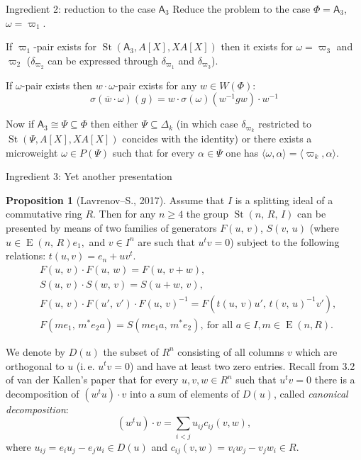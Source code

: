 \documentclass{beamer} %
\DeclareMathOperator{\E}{E}
\DeclareMathOperator{\St}{St}
\newcommand{\rA}{\mathsf{A}}
\theoremstyle{definition}
\newtheorem*{prop}{Proposition}
\begin{document}
\begin{frame}{Ingredient 2: reduction to the case $\rA_3$}
Reduce the problem to the case $\Phi = \rA_3$, $\omega = \varpi_1$.

\pause If $\varpi_1$-pair exists for $\St(\rA_3, A[X], XA[X])$ then it exists for $\omega = \varpi_3$ and $\varpi_2$ ($\delta_{\varpi_2}$ can be expressed through $\delta_{\varpi_1}$ and $\delta_{\varpi_3}$).

\pause If $\omega$-pair exists then $w \cdot \omega$-pair exists for any $w \in W(\Phi)$:
\[ \sigma(\overline{w} \cdot \omega)(g) = w \cdot \sigma(\omega)(w^{-1} g w) \cdot w^{-1} \]

\pause Now if $\rA_3 \cong \Psi \subseteq \Phi$ then either $\Psi \subseteq \Delta_k$ (in which case $\delta_{\varpi_k}$ restricted to $\St(\Psi, A[X], XA[X])$ concides with the identity) or there exists a microweight $\omega \in P(\Psi)$ such that for every $\alpha \in \Psi$ one has $\langle \omega, \alpha \rangle = \langle \varpi_k, \alpha \rangle$.
\end{frame}

\begin{frame}{Ingredient 3: Yet another presentation}
\begin{prop}[Lavrenov--S., 2017]
\label{prop:rel-presentation}
Assume that $I$ is a splitting ideal of a commutative ring $R$.
Then for any $n\geq 4$ the group $\St(n,\,R,\,I)$ can be presented by means of two families of generators $F(u,\,v)$, $S(v,\,u)$
(where $u\in \E(n,\,R)e_1,$ and $v\in I^n$ are such that $u^{t}v=0$) subject to the following relations: $t(u, v) = e_n + u v^t$.
\begin{align*}
&F(u,\,v)\cdot F(u,\,w)=F(u,\,v+w), \\
&S(u,\,v)\cdot S(w,\,v)=S(u+w,\,v), \\
&F(u,\,v)\cdot F(u',\,v') \cdot F(u,\,v)^{-1}=F(t(u,\,v)u',\,t(v,\,u)^{-1} v'), \\
&F(me_1,\,m^{*}e_{2}a)=S(me_{1}a,\,m^{*}e_{2}),\ \text{for all $a\in I$,}\, m \in \E(n, R).
\end{align*}
\end{prop}
\end{frame}

\begin{frame}
We denote by $D(u)$ the subset of $R^n$ consisting of all columns $v$ which are orthogonal to $u$
(i.\,e. $u^{t} v = 0$) and have at least two zero entries.
\pause Recall from 3.2 of van der Kallen's paper that for every $u, v, w \in R^n$ such that $u^t v = 0$ there is a decomposition of $(w^t u) \cdot v$ into a sum of elements of $D(u)$, called \textit{canonical decomposition}:
\pause \begin{equation}
\label{eq:canonical} (w^tu) \cdot v=\sum_{i<j}u_{ij} c_{ij}(v, w),
\end{equation}
where $u_{ij} =e_i u_j-e_j u_i \in D(u)$ and $c_{ij}(v, w) =v_i w_j-v_j w_i \in R$.
\end{frame}
\end{document}
